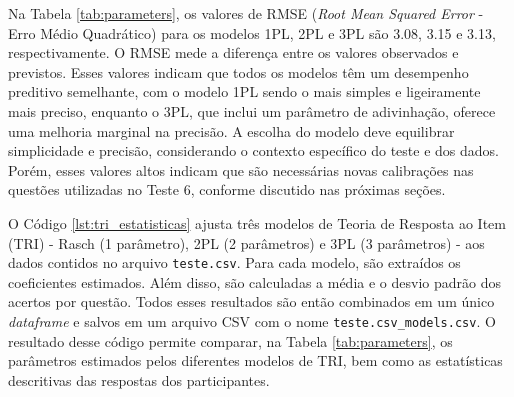 Na Tabela \ref{tab:parameters}, os valores de RMSE (\textit{Root Mean Squared Error} - Erro Médio Quadrático) para os modelos 1PL, 2PL e 3PL são 3.08, 3.15 e 3.13, respectivamente.  O RMSE mede a diferença entre os valores observados e previstos.  Esses valores indicam que todos os modelos têm um desempenho preditivo semelhante, com o modelo 1PL sendo o mais simples e ligeiramente mais preciso, enquanto o 3PL, que inclui um parâmetro de adivinhação, oferece uma melhoria marginal na precisão. A escolha do modelo deve equilibrar simplicidade e precisão, considerando o contexto específico do teste e dos dados. Porém, esses valores altos indicam que são necessárias novas calibrações nas questões utilizadas no Teste 6, conforme discutido nas próximas seções.

O Código \ref{lst:tri_estatisticas} ajusta três modelos de Teoria de Resposta ao Item (TRI) - Rasch (1 parâmetro), 2PL (2 parâmetros) e 3PL (3 parâmetros) - aos dados contidos no arquivo \verb|teste.csv|. Para cada modelo, são extraídos os coeficientes estimados. Além disso, são calculadas a média e o desvio padrão dos acertos por questão. Todos esses resultados são então combinados em um único \textit{dataframe} e salvos em um arquivo CSV com o nome \verb|teste.csv_models.csv|. O resultado desse código permite comparar, na Tabela \ref{tab:parameters}, os parâmetros estimados pelos diferentes modelos de TRI, bem como as estatísticas descritivas das respostas dos participantes.



